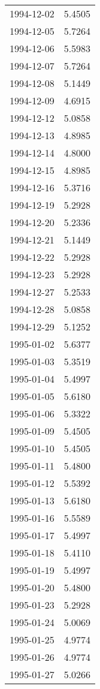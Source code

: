 \begin{tabular}{lr}
1994-12-02 &      5.4505 \\
1994-12-05 &      5.7264 \\
1994-12-06 &      5.5983 \\
1994-12-07 &      5.7264 \\
1994-12-08 &      5.1449 \\
1994-12-09 &      4.6915 \\
1994-12-12 &      5.0858 \\
1994-12-13 &      4.8985 \\
1994-12-14 &      4.8000 \\
1994-12-15 &      4.8985 \\
1994-12-16 &      5.3716 \\
1994-12-19 &      5.2928 \\
1994-12-20 &      5.2336 \\
1994-12-21 &      5.1449 \\
1994-12-22 &      5.2928 \\
1994-12-23 &      5.2928 \\
1994-12-27 &      5.2533 \\
1994-12-28 &      5.0858 \\
1994-12-29 &      5.1252 \\
1995-01-02 &      5.6377 \\
1995-01-03 &      5.3519 \\
1995-01-04 &      5.4997 \\
1995-01-05 &      5.6180 \\
1995-01-06 &      5.3322 \\
1995-01-09 &      5.4505 \\
1995-01-10 &      5.4505 \\
1995-01-11 &      5.4800 \\
1995-01-12 &      5.5392 \\
1995-01-13 &      5.6180 \\
1995-01-16 &      5.5589 \\
1995-01-17 &      5.4997 \\
1995-01-18 &      5.4110 \\
1995-01-19 &      5.4997 \\
1995-01-20 &      5.4800 \\
1995-01-23 &      5.2928 \\
1995-01-24 &      5.0069 \\
1995-01-25 &      4.9774 \\
1995-01-26 &      4.9774 \\
1995-01-27 &      5.0266 \\

\end{tabular}
